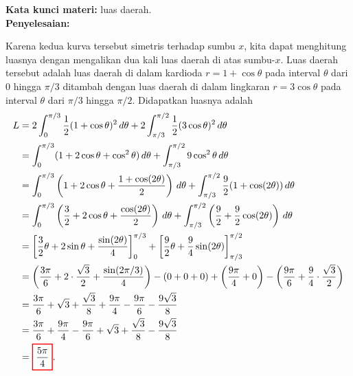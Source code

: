 \documentclass[10pt,openany,a4paper]{article}
\theoremstyle{definition}
\theoremstyle{definition}
\theoremstyle{plain}
\newenvironment{jawab}[2][tes]{
\textbf{Kata kunci materi:} #1.\\
\textbf{Penyelesaian:} #2
}{}
\newenvironment{jawaban}[2][tes]{
\colorlet{oldcolor}{.}
        \color{red}
        \setlength{\fboxrule}{1pt}\boxed{\color{oldcolor}#2}\color{oldcolor}.
}{}
\begin{document}
\begin{enumerate}
\begin{jawab}[luas daerah]
{\begin{center}
            \end{center}
            Karena kedua kurva tersebut simetris terhadap sumbu $x$, kita dapat menghitung luasnya dengan mengalikan dua kali luas daerah di atas sumbu-$x$.
            Luas daerah tersebut adalah luas daerah di dalam kardioda $r=1+\cos\theta$ pada interval $\theta$ dari $0$ hingga $\pi/3$ ditambah dengan luas daerah di dalam lingkaran $r=3\cos\theta$ pada interval $\theta$ dari $\pi/3$ hingga $\pi/2$. Didapatkan luasnya adalah 
            \begin{align*}
L &= 2\int_0^{\pi/3} \frac{1}{2}(1+\cos \theta)^2 \, d\theta + 2\int_{\pi/3}^{\pi/2} \frac{1}{2}(3\cos \theta)^2 \, d\theta\\
&= \int_0^{\pi/3} (1 + 2\cos \theta + \cos^2 \theta) \, d\theta + \int_{\pi/3}^{\pi/2} 9\cos^2 \theta \, d\theta\\
&= \int_0^{\pi/3} \left(1 + 2\cos \theta + \frac{1 + \cos(2\theta)}{2}\right) \, d\theta + \int_{\pi/3}^{\pi/2} \frac{9}{2}(1 + \cos(2\theta)) \, d\theta\\
&= \int_0^{\pi/3} \left(\frac{3}{2} + 2\cos \theta + \frac{\cos(2\theta)}{2}\right  ) \, d\theta + \int_{\pi/3}^{\pi/2} \left(\frac{9}{2} + \frac{9}{2}\cos(2\theta)\right) \, d\theta\\
&= \left[\frac{3}{2}\theta + 2\sin \theta + \frac{\sin(2\theta)}{4}\right]_0^{\pi/3} + \left[\frac{9}{2}\theta + \frac{9}{4}\sin(2\theta)\right]_{\pi/3}^{\pi/2}\\
&= \left(\frac{3\pi}{6} + 2\cdot \frac{\sqrt{3}}{2} + \frac{\sin(2\pi/3)}{4}\right) - \left(0 + 0 + 0\right) + \left(\frac{9\pi}{4} + 0\right) - \left(\frac{9\pi}{6} + \frac{9}{4}\cdot \frac{\sqrt{3}}{2}\right)\\
&= \frac{3\pi}{6} + \sqrt{3} + \frac{\sqrt{3}}{8} + \frac{9\pi}{4} - \frac{9\pi}{6} - \frac{9\sqrt{3}}{8}\\
&= \frac{3\pi}{6} + \frac{9\pi}{4} - \frac{9\pi}{6} + \sqrt{3} + \frac{\sqrt{3}}{8} - \frac{9\sqrt{3}}{8}\\
&= \begin{jawaban}{\frac{5\pi}{4}}\end{jawaban}
\end{align*}
            }


\end{jawab}
\end{enumerate}
\end{document}
